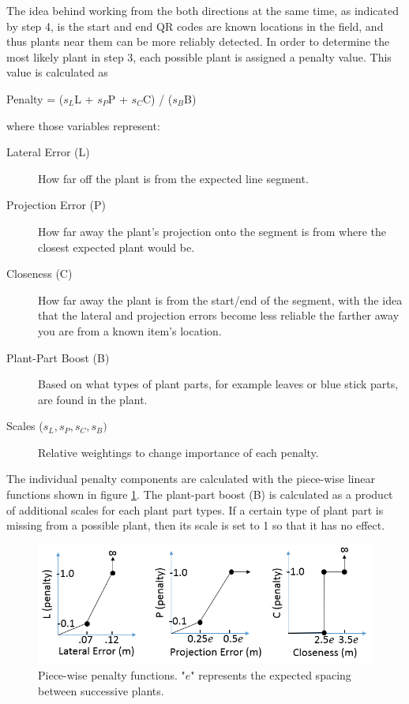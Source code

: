 The idea behind working from the both directions at the same time, as indicated by step 4, is the start and end QR codes are known locations in the field, and thus plants near them can be more reliably detected.  In order to determine the most likely plant in step 3, each possible plant is assigned a penalty value.  This value is calculated as

\begin{center}
Penalty = ($s_L$L + $s_P$P + $s_C$C) / ($s_B$B)
\end{center}
where those variables represent:

\begin{description}
\item[Lateral Error (L)] How far off the plant is from the expected line segment.
\item[Projection Error (P)] How far away the plant's projection onto the segment is from where the closest expected plant would be.
\item[Closeness (C)] How far away the plant is from the start/end of the segment, with the idea that the lateral and projection errors become less reliable the farther away you are from a known item's location.
\item[Plant-Part Boost (B)] Based on what types of plant parts, for example leaves or blue stick parts, are found in the plant.
\item[Scales ($s_L,s_P,s_C,s_B)$] Relative weightings to change importance of each penalty.
\end{description}

The individual penalty components are calculated with the piece-wise linear functions shown in figure \ref{figure:piecewise_penalties}.  The plant-part boost (B) is calculated as a product of additional scales for each plant part types.  If a certain type of plant part is missing from a possible plant, then its scale is set to 1 so that it has no effect.  

\begin{figure}[hb]
	\centering
    \includegraphics[width=5.5in]{figures/piece_wise.png}
    \caption[Group segments]{Piece-wise penalty functions. "$e$" represents the expected spacing between successive plants.}
    \label{figure:piecewise_penalties}
\end{figure}

